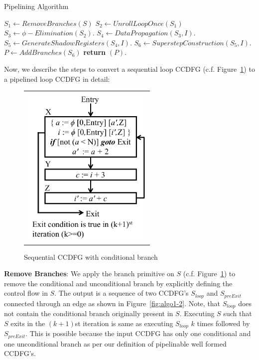 \begin{algorithm}[H]
\caption{Pipelining Algorithm}
\label{algo:loop}
\begin{algorithmic}[1]
\State $S_1 \leftarrow RemoveBranches(S)$
\State $S_2 \leftarrow UnrollLoopOnce(S_1)$
\State $S_3 \leftarrow \phi-Elimination (S_2) $.
\State $S_4 \leftarrow DataPropagation (S_3, I) $.
\State $S_5 \leftarrow GenerateShadowRegisters (S_4, I) $.
\State $ S_6 \leftarrow SuperstepConstruction (S_5, I) $.
\State $P \leftarrow AddBranches (S_6) $
\State \textbf{return} $(P)$.
\EndProcedure
\end{algorithmic}
\end{algorithm}

Now, we describe the steps to convert a sequential loop CCDFG (c.f. Figure~\ref{fig:algo1-1}) to a pipelined loop CCDFG in detail:

\begin{figure}[H]
\begin{center}
\begin{tabular}{c}
\includegraphics[height=3.1in]{fig-proposal/seq-ccdfg}
\end{tabular}
\end{center}
\caption{Sequential CCDFG with conditional branch}
\label{fig:algo1-1}
\end{figure}
 
{\bf Remove Branches}: We apply the branch primitive on $S$ (c.f. Figure~\ref{fig:algo1-1}) to remove the conditional and unconditional branch by explicitly defining the control flow in $S$. The output is a sequence of two CCDFG's $S_{loop}$ and $S_{preExit}$ connected through an edge as shown in Figure~\ref{fig:algo1-2}.
Note, that $S_{loop}$ does not contain the conditional branch originally present in $S$.
Executing $S$ such that $S$ exits in the $(k+1)$st iteration is same as executing $S_{loop}$ $k$ times
followed by $S_{preExit}$. This is possible because the input CCDFG has only one conditional and one unconditional branch as per our definition of pipelinable well formed CCDFG's.


